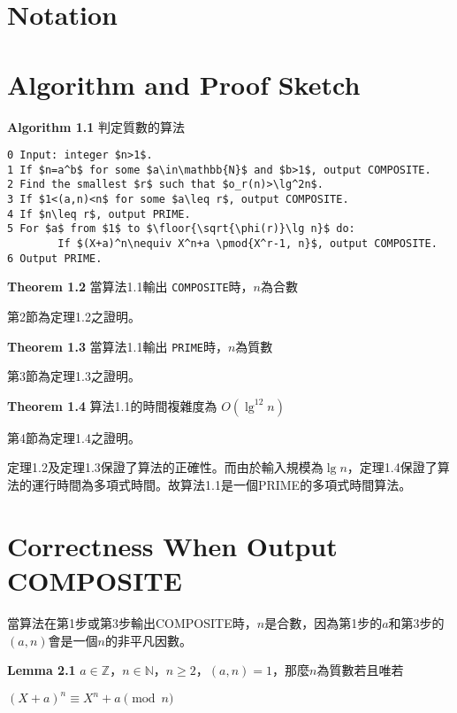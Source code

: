 \documentclass{article}
\DeclarePairedDelimiter\floor{\lfloor}{\rfloor}
\newcommand{\nequiv}{\not\equiv}
\begin{document}
\section{Notation}
\section{Algorithm and Proof Sketch}
\begin{mdframed}
\noindent\textbf{Algorithm 1.1} 判定質數的算法
\begin{lstlisting}[mathescape=true]
0 Input: integer $n>1$.
1 If $n=a^b$ for some $a\in\mathbb{N}$ and $b>1$, output COMPOSITE.
2 Find the smallest $r$ such that $o_r(n)>\lg^2n$.
3 If $1<(a,n)<n$ for some $a\leq r$, output COMPOSITE.
4 If $n\leq r$, output PRIME.
5 For $a$ from $1$ to $\floor{\sqrt{\phi(r)}\lg n}$ do:
        If $(X+a)^n\nequiv X^n+a \pmod{X^r-1, n}$, output COMPOSITE.
6 Output PRIME.
\end{lstlisting}
\end{mdframed}

\begin{mdframed}
\noindent\textbf{Theorem 1.2} 當算法1.1輸出 \texttt{COMPOSITE}時，$n$為合數
\end{mdframed}

    第2節為定理1.2之證明。

\begin{mdframed}
\noindent\textbf{Theorem 1.3} 當算法1.1輸出 \texttt{PRIME}時，$n$為質數
\end{mdframed}

    第3節為定理1.3之證明。

\begin{mdframed}
\noindent\textbf{Theorem 1.4} 算法1.1的時間複雜度為 \(O(\lg^{12}n)\)
\end{mdframed}
    
    第4節為定理1.4之證明。

    定理1.2及定理1.3保證了算法的正確性。而由於輸入規模為$\lg n$，定理1.4保證了算法的運行時間為多項式時間。故算法1.1是一個PRIME的多項式時間算法。

\section{Correctness When Output COMPOSITE}

    當算法在第1步或第3步輸出COMPOSITE時，$n$是合數，因為第1步的$a$和第3步的$(a,n)$會是一個$n$的非平凡因數。

\begin{mdframed}
\noindent\textbf{Lemma 2.1} $a\in\mathbb{Z}$，$n\in\mathbb{N}$，$n\geq 2$，$(a,n)=1$，那麼$n$為質數若且唯若\\
    \centerline{$(X+a)^n\equiv X^n+a \pmod{n}$}
\end{mdframed}
\end{document}
